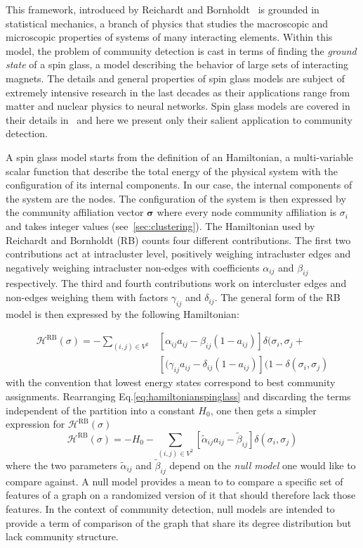 This framework, introduced by Reichardt and Bornholdt~\cite{reichardt2006} is grounded in statistical mechanics, a branch of physics that studies the macroscopic and microscopic properties of systems of many interacting elements. Within this model, the problem of community detection is cast in terms of finding the \emph{ground state} of a spin glass, a model describing the behavior of large sets of interacting magnets.
The details and general properties of spin glass models are subject of extremely intensive research in the last decades as their applications range from matter and nuclear physics to neural networks. Spin glass models are covered in their details in~\cite{Mezard1990} and here we present only their salient application to community detection.

A spin glass model starts from the definition of an Hamiltonian, a multi-variable scalar function that describe the total energy of the physical system with the configuration of its internal components. In our case, the internal components of the system are the nodes. The configuration of the system is then expressed by the community affiliation vector $\boldsymbol\sigma$ where every node community affiliation is $\sigma_i$ and takes integer values (see~\ref{sec:clustering}).
The Hamiltonian used by Reichardt and Bornholdt (RB) counts four different contributions. The first two contributions act at intracluster level, positively weighing intracluster edges and negatively weighing intracluster non-edges with coefficients $\alpha_{ij}$ and $\beta_{ij}$ respectively. The third and fourth contributions work on intercluster edges and non-edges  weighing them with factors $\gamma_{ij}$ and $\delta_{ij}$. The general form of the RB model is then expressed by the following Hamiltonian:

\begin{align}\label{eq:hamiltonianspinglass}
\mathcal{H}^{\textrm{RB}}(\sigma) = - \sum_{(i,j)\in V^2} & \left[ \alpha_{ij} a_{ij} - \beta_{ij}(1-a_{ij}) \right] \delta(\sigma_i,\sigma_j + \nonumber \\ &  \left[ (\gamma_{ij} a_{ij} - \delta_{ij}(1-a_{ij}) \right] (1-\delta(\sigma_i,\sigma_j)
\end{align}
with the convention that lowest energy states correspond to best community assignments.
Rearranging Eq.\ref{eq:hamiltonianspinglass} and discarding the terms independent of the partition into a constant $H_0$, one then gets a simpler expression for $\mathcal{H}^{\textrm{RB}}(\sigma)$
\begin{equation}\label{eq:rbspinglass}
\mathcal{H}^{\textrm{RB}}(\sigma) = -H_0 - \sum \limits_{(i,j)\in V^2} \left[ \tilde{\alpha}_{ij} a_{ij} - \tilde{\beta}_{ij} \right] \delta(\sigma_i,\sigma_j)
\end{equation}
where the two parameters $\tilde{\alpha}_{ij}$ and $\tilde{\beta}_{ij}$ depend on the \emph{null model} one would like to compare against. A null model provides a mean to to compare a specific set of features of a graph on a randomized version of it that should therefore lack those features. In the context of community detection, null models are intended to provide a term of comparison of the graph that share its degree distribution but lack community structure.

